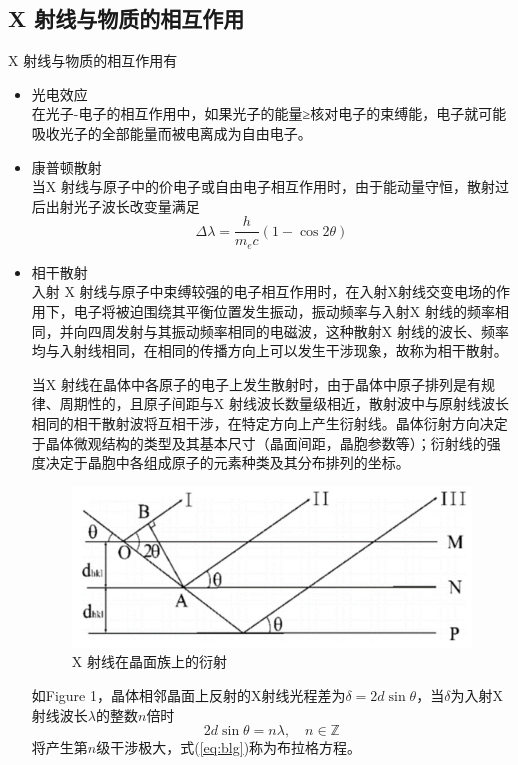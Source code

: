 \documentclass[10.5pt]{article}
\renewcommand{\=}[1]{\stackrel{#1}{=}} %
\theoremstyle{definition}
\theoremstyle{remark}
\begin{document}
	\subsection{X 射线与物质的相互作用}
	X 射线与物质的相互作用有
	\begin{itemize}
		\item 光电效应\\
		在光子-电子的相互作用中，如果光子的能量≥核对电子的束缚能，电子就可能吸收光子的全部能量而被电离成为自由电子。
		\item 康普顿散射\\
		当X 射线与原子中的价电子或自由电子相互作用时，由于能动量守恒，散射过后出射光子波长改变量满足
		\begin{equation}
			\Delta\lambda=\dfrac{h}{m_ec}(1-\cos2\theta)
		\end{equation}
		\item 相干散射\\
		入射 X 射线与原子中束缚较强的电子相互作用时，在入射X射线交变电场的作用下，电子将被迫围绕其平衡位置发生振动，振动频率与入射X 射线的频率相同，并向四周发射与其振动频率相同的电磁波，这种散射X 射线的波长、频率均与入射线相同，在相同的传播方向上可以发生干涉现象，故称为相干散射。
		
		当X 射线在晶体中各原子的电子上发生散射时，由于晶体中原子排列是有规律、周期性的，且原子间距与X 射线波长数量级相近，散射波中与原射线波长相同的相干散射波将互相干涉，在特定方向上产生衍射线。晶体衍射方向决定于晶体微观结构的类型及其基本尺寸（晶面间距，晶胞参数等）；衍射线的强度决定于晶胞中各组成原子的元素种类及其分布排列的坐标。
		\begin{figure}[H]
			\centering
			\includegraphics[scale=0.4]{1.jpg}
			\captionsetup{font=footnotesize}
			\caption{X 射线在晶面族上的衍射}
		\end{figure}
		如Figure 1，晶体相邻晶面上反射的X射线光程差为$\delta=2d\sin\theta$，当$\delta$为入射X射线波长$\lambda$的整数$n$倍时
		\begin{equation}\label{eq:blg}
			2d\sin\theta=n\lambda,\quad n\in\mathbb{Z}
		\end{equation}
		将产生第$n$级干涉极大，式(\ref{eq:blg})称为布拉格方程。
	\end{itemize}
\end{document}
